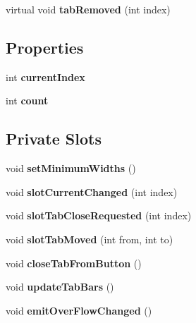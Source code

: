\begin{DoxyCompactItemize}
\item 
\hypertarget{class_combo_tab_bar_a81e98edcbd2467a08cf70e8af942a9c7}{
virtual void {\bfseries tabRemoved} (int index)}
\label{class_combo_tab_bar_a81e98edcbd2467a08cf70e8af942a9c7}

\end{DoxyCompactItemize}
\subsection*{Properties}
\begin{DoxyCompactItemize}
\item 
\hypertarget{class_combo_tab_bar_a6c31d71f78a5bec1c76dfb4d266464e3}{
int {\bfseries currentIndex}}
\label{class_combo_tab_bar_a6c31d71f78a5bec1c76dfb4d266464e3}

\item 
\hypertarget{class_combo_tab_bar_afa1a0d26530e0d4d21dee3273abcd831}{
int {\bfseries count}}
\label{class_combo_tab_bar_afa1a0d26530e0d4d21dee3273abcd831}

\end{DoxyCompactItemize}
\subsection*{Private Slots}
\begin{DoxyCompactItemize}
\item 
\hypertarget{class_combo_tab_bar_afe1a53dbe57271afbb725b609d74623a}{
void {\bfseries setMinimumWidths} ()}
\label{class_combo_tab_bar_afe1a53dbe57271afbb725b609d74623a}

\item 
\hypertarget{class_combo_tab_bar_ae8020108ae4d79d1f9337344d4764600}{
void {\bfseries slotCurrentChanged} (int index)}
\label{class_combo_tab_bar_ae8020108ae4d79d1f9337344d4764600}

\item 
\hypertarget{class_combo_tab_bar_afa7c13566d5e9f261b37a37a217a3086}{
void {\bfseries slotTabCloseRequested} (int index)}
\label{class_combo_tab_bar_afa7c13566d5e9f261b37a37a217a3086}

\item 
\hypertarget{class_combo_tab_bar_a29d5becee02b839d98287edd0499ab10}{
void {\bfseries slotTabMoved} (int from, int to)}
\label{class_combo_tab_bar_a29d5becee02b839d98287edd0499ab10}

\item 
\hypertarget{class_combo_tab_bar_ab4a00eed0da98fac7cc68deab83b93b5}{
void {\bfseries closeTabFromButton} ()}
\label{class_combo_tab_bar_ab4a00eed0da98fac7cc68deab83b93b5}

\item 
\hypertarget{class_combo_tab_bar_a0735e73e3f67b34a39237ebb6b6d3040}{
void {\bfseries updateTabBars} ()}
\label{class_combo_tab_bar_a0735e73e3f67b34a39237ebb6b6d3040}

\item 
\hypertarget{class_combo_tab_bar_afca20d3ddbd5220cd1c5abb347d68693}{
void {\bfseries emitOverFlowChanged} ()}
\label{class_combo_tab_bar_afca20d3ddbd5220cd1c5abb347d68693}

\end{DoxyCompactItemize}
